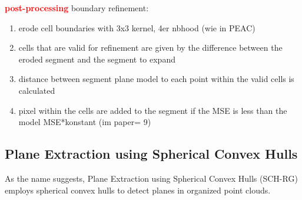 \documentclass[main.tex]{subfiles}
\begin{document}
\textbf{\textcolor{red}{post-processing}}
boundary refinement:
\begin{enumerate}
    \item erode cell boundaries with 3x3 kernel, 4er nbhood (wie in PEAC) 
    \item cells that are valid for refinement are given by the difference between the eroded segment and the segment to expand
    \item distance between segment plane model to each point within the valid cells is calculated 
    \item pixel within the cells are added to the segment if the MSE is less than the model MSE*konstant (im paper= 9)
\end{enumerate}


\subsection{Plane Extraction using Spherical Convex Hulls}
As the name suggests, Plane Extraction using Spherical Convex Hulls (SCH-RG) employs spherical convex hulls to detect planes in organized point clouds.
\end{document}
